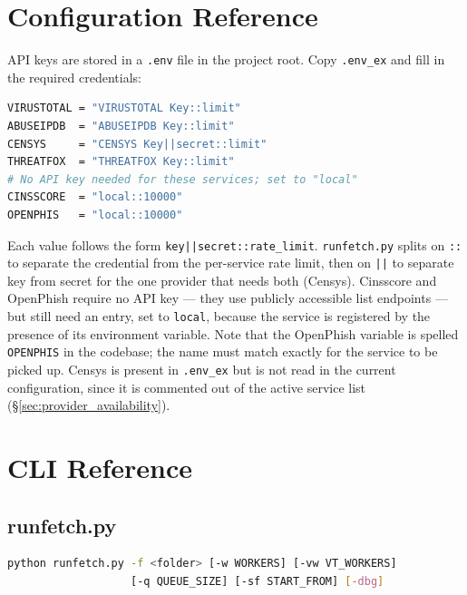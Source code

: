 \documentclass[12pt, a4paper, twoside]{report}
\begin{document}

\appendix

\chapter{Configuration Reference}
\label{app:config}

API keys are stored in a \texttt{.env} file in the project root. Copy \texttt{.env\_ex} and fill
in the required credentials:
\begin{lstlisting}[language=bash, caption={Example .env configuration}]
VIRUSTOTAL = "VIRUSTOTAL Key::limit"
ABUSEIPDB  = "ABUSEIPDB Key::limit"
CENSYS     = "CENSYS Key||secret::limit"
THREATFOX  = "THREATFOX Key::limit"
# No API key needed for these services; set to "local"
CINSSCORE  = "local::10000"
OPENPHIS   = "local::10000"
\end{lstlisting}

Each value follows the form \texttt{key||secret::rate\_limit}. \texttt{runfetch.py} splits on
\texttt{::} to separate the credential from the per-service rate limit, then on \texttt{||} to
separate key from secret for the one provider that needs both (Censys). Cinsscore and OpenPhish
require no API key --- they use publicly accessible list endpoints --- but still need an entry, set
to \texttt{local}, because the service is registered by the presence of its environment variable.
Note that the OpenPhish variable is spelled \texttt{OPENPHIS} in the codebase; the name must match
exactly for the service to be picked up. Censys is present in \texttt{.env\_ex} but is not read in
the current configuration, since it is commented out of the active service list
(\S\ref{sec:provider_availability}).

\chapter{CLI Reference}
\label{app:cli}

\section{runfetch.py}

\begin{lstlisting}[language=bash]
python runfetch.py -f <folder> [-w WORKERS] [-vw VT_WORKERS]
                   [-q QUEUE_SIZE] [-sf START_FROM] [-dbg]
\end{lstlisting}
\end{document}
